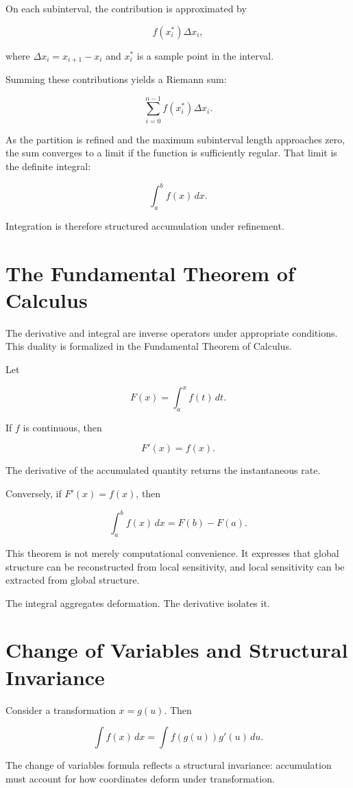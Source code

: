 \documentclass[12pt]{book}
\begin{document}
On each subinterval, the contribution is approximated by

\[
f(x_i^*) \Delta x_i,
\]

where $\Delta x_i = x_{i+1} - x_i$ and $x_i^*$ is a sample point in the interval.

Summing these contributions yields a Riemann sum:

\[
\sum_{i=0}^{n-1} f(x_i^*) \Delta x_i.
\]

As the partition is refined and the maximum subinterval length approaches zero, the sum converges to a limit if the function is sufficiently regular. That limit is the definite integral:

\[
\int_a^b f(x)\, dx.
\]

Integration is therefore structured accumulation under refinement.

\section{The Fundamental Theorem of Calculus}

The derivative and integral are inverse operators under appropriate conditions. This duality is formalized in the Fundamental Theorem of Calculus.

Let

\[
F(x) = \int_a^x f(t)\, dt.
\]

If $f$ is continuous, then

\[
F'(x) = f(x).
\]

The derivative of the accumulated quantity returns the instantaneous rate.

Conversely, if $F'(x) = f(x)$, then

\[
\int_a^b f(x)\, dx = F(b) - F(a).
\]

This theorem is not merely computational convenience. It expresses that global structure can be reconstructed from local sensitivity, and local sensitivity can be extracted from global structure.

The integral aggregates deformation. The derivative isolates it.

\section{Change of Variables and Structural Invariance}

Consider a transformation $x = g(u)$. Then

\[
\int f(x)\, dx = \int f(g(u)) g'(u)\, du.
\]

The change of variables formula reflects a structural invariance: accumulation must account for how coordinates deform under transformation.
\end{document}
